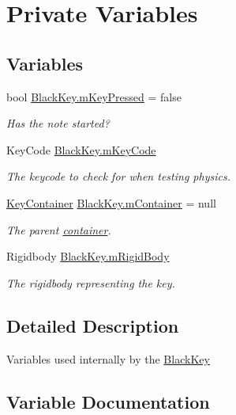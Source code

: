 \hypertarget{group___black_key_priv_var}{}\section{Private Variables}
\label{group___black_key_priv_var}
\subsection*{Variables}
\begin{DoxyCompactItemize}
\item 
bool \hyperlink{group___black_key_priv_var_gaf66e1f99786497961efaf5ded22e4977}{Black\+Key.\+m\+Key\+Pressed} = false
\begin{DoxyCompactList}\small\item\em Has the note started? \end{DoxyCompactList}\item 
Key\+Code \hyperlink{group___black_key_priv_var_ga2272fa345880793dcd89f7ca942f6685}{Black\+Key.\+m\+Key\+Code}
\begin{DoxyCompactList}\small\item\em The keycode to check for when testing physics. \end{DoxyCompactList}\item 
\hyperlink{class_key_container}{Key\+Container} \hyperlink{group___black_key_priv_var_ga11beacc28de4d17e70c4188bfdc2bdf0}{Black\+Key.\+m\+Container} = null
\begin{DoxyCompactList}\small\item\em The parent \hyperlink{group___doc_key_contain}{container}. \end{DoxyCompactList}\item 
Rigidbody \hyperlink{group___black_key_priv_var_ga5185c6ea66892bcbe9e83eb615f39566}{Black\+Key.\+m\+Rigid\+Body}
\begin{DoxyCompactList}\small\item\em The rigidbody representing the key. \end{DoxyCompactList}\end{DoxyCompactItemize}


\subsection{Detailed Description}
Variables used internally by the \hyperlink{class_black_key}{Black\+Key} 

\subsection{Variable Documentation}
\mbox{\label{group___black_key_priv_var_ga11beacc28de4d17e70c4188bfdc2bdf0}} 

